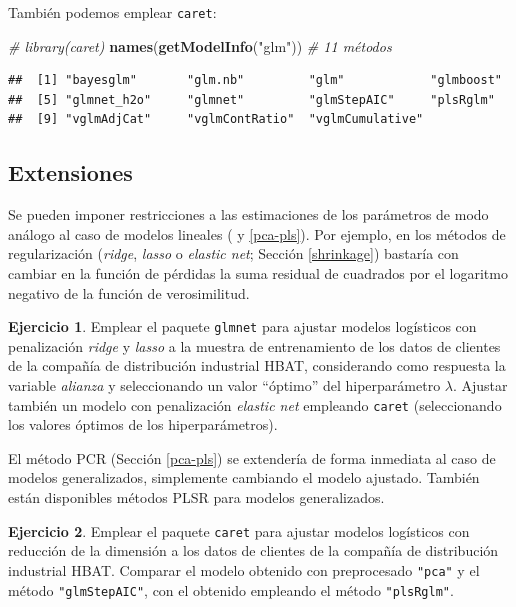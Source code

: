 \documentclass[
  spanish,
]{book}
\newenvironment{Shaded}{\begin{snugshade}}{\end{snugshade}}
\newcommand{\CommentTok}[1]{\textcolor[rgb]{0.56,0.35,0.01}{\textit{#1}}}
\newcommand{\KeywordTok}[1]{\textcolor[rgb]{0.13,0.29,0.53}{\textbf{#1}}}
\newcommand{\NormalTok}[1]{#1}
\newcommand{\StringTok}[1]{\textcolor[rgb]{0.31,0.60,0.02}{#1}}
\theoremstyle{break}
\theoremstyle{definition}
\theoremstyle{definition}
\theoremstyle{definition}
\newtheorem{exercise}{Ejercicio}[chapter]
\theoremstyle{remark}
\begin{document}
También podemos emplear \texttt{caret}:

\begin{Shaded}
\begin{Highlighting}[]
\CommentTok{# library(caret)}
\KeywordTok{names}\NormalTok{(}\KeywordTok{getModelInfo}\NormalTok{(}\StringTok{"glm"}\NormalTok{)) }\CommentTok{# 11 métodos}
\end{Highlighting}
\end{Shaded}

\begin{verbatim}
##  [1] "bayesglm"       "glm.nb"         "glm"            "glmboost"      
##  [5] "glmnet_h2o"     "glmnet"         "glmStepAIC"     "plsRglm"       
##  [9] "vglmAdjCat"     "vglmContRatio"  "vglmCumulative"
\end{verbatim}

\hypertarget{extensiones}{%
\subsection{Extensiones}\label{extensiones}}

Se pueden imponer restricciones a las estimaciones de los parámetros de modo análogo al caso de modelos lineales ( y \ref{pca-pls}).
Por ejemplo, en los métodos de regularización (\emph{ridge}, \emph{lasso} o \emph{elastic net}; Sección \ref{shrinkage}) bastaría con cambiar en la función de pérdidas la suma residual de cuadrados por el logaritmo negativo de la función de verosimilitud.

\begin{exercise}
\protect\hypertarget{exr:glmnet}{}{\label{exr:glmnet} }
Emplear el paquete \texttt{glmnet} para ajustar modelos logísticos con penalización \emph{ridge} y \emph{lasso} a la muestra de entrenamiento de los datos de clientes de la compañía de distribución industrial HBAT, considerando como respuesta la variable \emph{alianza} y seleccionando un valor ``óptimo'' del hiperparámetro \(\lambda\).
Ajustar también un modelo con penalización \emph{elastic net} empleando \texttt{caret} (seleccionando los valores óptimos de los hiperparámetros).
\end{exercise}

El método PCR (Sección \ref{pca-pls}) se extendería de forma inmediata al caso de modelos generalizados, simplemente cambiando el modelo ajustado.
También están disponibles métodos PLSR para modelos generalizados.

\begin{exercise}
\protect\hypertarget{exr:glm-reduccion}{}{\label{exr:glm-reduccion} }
Emplear el paquete \texttt{caret} para ajustar modelos logísticos con reducción de la dimensión a los datos de clientes de la compañía de distribución industrial HBAT. Comparar el modelo obtenido con preprocesado \texttt{"pca"} y el método \texttt{"glmStepAIC"}, con el obtenido empleando el método \texttt{"plsRglm"}.
\end{exercise}
\end{document}
